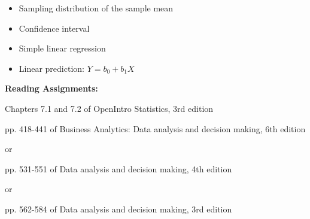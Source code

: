 \documentclass[11pt]{article}
\begin{document}
\begin{itemize}

\item Sampling distribution of the sample mean

\item Confidence interval


\item Simple linear regression
\item Linear prediction: $Y=b_0+b_1 X$




\end{itemize}

\noindent\textbf{Reading Assignments:}

Chapters 7.1 and 7.2 of OpenIntro Statistics, 3rd edition



pp. 418-441 of Business Analytics: Data analysis and decision making, 6th edition

or

pp. 531-551 of Data analysis and decision making, 4th edition

or 

pp. 562-584 of  Data analysis and decision making, 3rd edition\\
\end{document}
